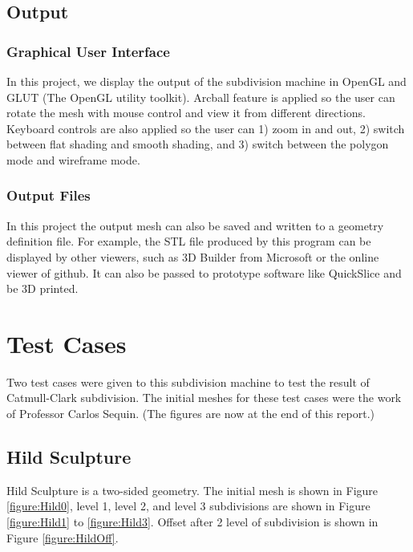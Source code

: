 \documentclass[12pt]{article}
\begin{document}
\subsection{Output}
\subsubsection{Graphical User Interface}
In this project, we display the output of the subdivision machine in OpenGL and GLUT (The OpenGL utility toolkit). 
Arcball feature is applied so the user can rotate the mesh with mouse control and view it from different directions. 
Keyboard controls are also applied so the user can 1) zoom in and out, 2) switch between flat shading and smooth shading, and 3) switch between the polygon mode and wireframe mode.
\subsubsection{Output Files}
In this project the output mesh can also be saved and written to a geometry definition file. For example, the STL file produced by this program can be displayed by other viewers, such as 3D Builder from Microsoft or the online viewer of github. It can also be passed to prototype software like QuickSlice and be 3D printed.

\newpage
\section{Test Cases}
Two test cases were given to this subdivision machine to test the result of Catmull-Clark subdivision. The initial meshes for these test cases were the work of Professor Carlos Sequin. (The figures are now at the end of this report.)
\subsection{Hild Sculpture}
Hild Sculpture is a two-sided geometry. The initial mesh is shown in Figure \ref{figure:Hild0}, level 1, level 2, and level 3 subdivisions are shown in Figure \ref{figure:Hild1} to \ref{figure:Hild3}. Offset after 2 level of subdivision is shown in Figure \ref{figure:HildOff}.
\end{document}

